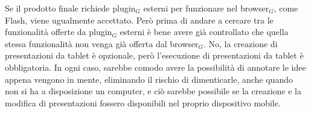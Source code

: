 \chrule
{}%
{Se il prodotto finale richiede plugin$_G$ esterni per funzionare 
nel browser$_G$, come Flash, viene ugualmente accettato. Però prima di andare a cercare tra le funzionalità offerte da plugin$_G$ esterni 
è bene avere già controllato che quella stessa funzionalità non venga già offerta dal browser$_G$.}
\chrule
{}%
{No, la creazione di presentazioni da tablet è opzionale, però l'esecuzione di 
presentazioni da tablet è obbligatoria. 
In ogni caso, sarebbe comodo avere la possibilità di annotare le idee appena vengono in mente, eliminando il rischio di dimenticarle,
anche quando non si ha a disposizione un computer,
e ciò sarebbe possibile se la creazione e la modifica di presentazioni fossero disponibili nel proprio dispositivo mobile.}
